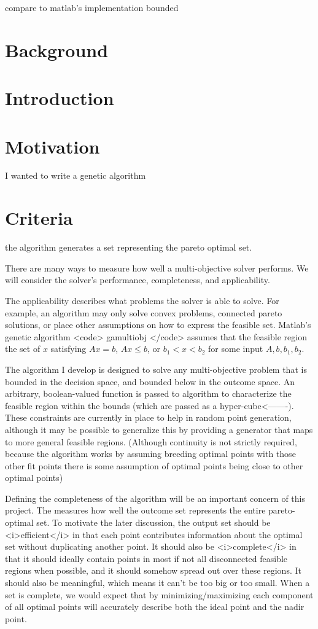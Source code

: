 



compare to matlab's implementation
bounded


\section{Background}
\section{Introduction}
\section{Motivation}
I wanted to write a genetic algorithm
\section{Criteria}

the algorithm generates a set representing the pareto optimal set.

There are many ways to measure how well a multi-objective solver performs.
We will consider the solver's performance, completeness, and applicability.

The applicability describes what problems the solver is able to solve.
For example, an algorithm may only solve convex problems, connected pareto solutions, or place other assumptions on how to express the feasible set.
Matlab's genetic algorithm <code> gamultiobj </code> assumes that the feasible region the set of $x$ satisfying $Ax = b$, $Ax \le b$, or $b_1 < x < b_2$ for some input $A, b, b_1, b_2$.

The algorithm I develop is designed to solve any multi-objective problem that is bounded in the decision space, and bounded below in the outcome space.
An arbitrary, boolean-valued function is passed to algorithm to characterize the feasible region within the bounds (which are passed as a hyper-cube<-------).
These constraints are currently in place to help in random point generation, although it may be possible to generalize this by providing a generator that maps to more general feasible regions.
(Although continuity is not strictly required, because the algorithm works by assuming breeding optimal points with those other fit points there is some assumption of optimal points being close to other optimal points)

Defining the completeness of the algorithm will be an important concern of this project.
The measures how well the outcome set represents the entire pareto-optimal set.
To motivate the later discussion, the output set should be <i>efficient</i> in that each point contributes information about the optimal set without duplicating another point.
It should also be <i>complete</i> in that it should ideally contain points in most if not all disconnected feasible regions when possible, and it should somehow spread out over these regions.
It should also be meaningful, which means it can't be too big or too small.
When a set is complete, we would expect that by minimizing/maximizing each component of all optimal points will accurately describe both the ideal point and the nadir point.


